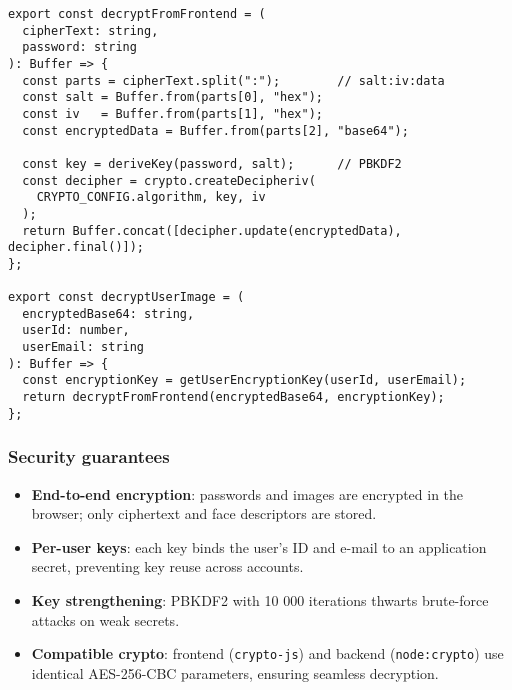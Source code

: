 \begin{verbatim}
export const decryptFromFrontend = (
  cipherText: string,
  password: string
): Buffer => {
  const parts = cipherText.split(":");        // salt:iv:data
  const salt = Buffer.from(parts[0], "hex");
  const iv   = Buffer.from(parts[1], "hex");
  const encryptedData = Buffer.from(parts[2], "base64");

  const key = deriveKey(password, salt);      // PBKDF2
  const decipher = crypto.createDecipheriv(
    CRYPTO_CONFIG.algorithm, key, iv
  );
  return Buffer.concat([decipher.update(encryptedData), decipher.final()]);
};

export const decryptUserImage = (
  encryptedBase64: string,
  userId: number,
  userEmail: string
): Buffer => {
  const encryptionKey = getUserEncryptionKey(userId, userEmail);
  return decryptFromFrontend(encryptedBase64, encryptionKey);
};
\end{verbatim}

\subsubsection{Security guarantees}

\begin{itemize}
  \item \textbf{End-to-end encryption}: passwords and images are encrypted in the browser; only ciphertext and face descriptors are stored.  
  \item \textbf{Per-user keys}: each key binds the user's ID and e-mail to an application secret, preventing key reuse across accounts.  
  \item \textbf{Key strengthening}: PBKDF2 with 10 000 iterations thwarts brute-force attacks on weak secrets.  
  \item \textbf{Compatible crypto}: frontend (\texttt{crypto-js}) and backend (\texttt{node:crypto}) use identical AES-256-CBC parameters, ensuring seamless decryption.  
\end{itemize}

